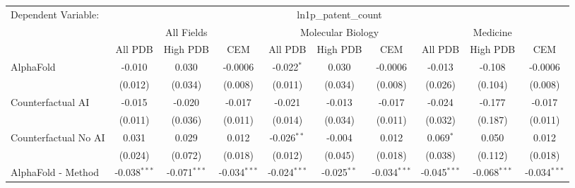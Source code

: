 \begingroup
\centering
\begin{tabular}{lccccccccc}
   \tabularnewline \midrule \midrule
   Dependent Variable: & \multicolumn{9}{c}{ln1p\_patent\_count}\\
 & \multicolumn{3}{c}{All Fields} & \multicolumn{3}{c}{Molecular Biology} & \multicolumn{3}{c}{Medicine} \\
\cmidrule(lr){2-7} \cmidrule(lr){5-10} \cmidrule(lr){8-7}
 & \multicolumn{1}{c}{All PDB} & \multicolumn{1}{c}{High PDB} & \multicolumn{1}{c}{CEM} & \multicolumn{1}{c}{All PDB} & \multicolumn{1}{c}{High PDB} & \multicolumn{1}{c}{CEM} & \multicolumn{1}{c}{All PDB} & \multicolumn{1}{c}{High PDB} & \multicolumn{1}{c}{CEM} \\
\cmidrule(lr){2-3} \cmidrule(lr){3-4} \cmidrule(lr){4-5} \cmidrule(lr){5-6} \cmidrule(lr){6-7} \cmidrule(lr){7-8} \cmidrule(lr){8-9} \cmidrule(lr){9-10} \cmidrule(lr){10-3}
   AlphaFold                                                   & -0.010         & 0.030          & -0.0006        & -0.022$^{*}$   & 0.030         & -0.0006        & -0.013         & -0.108         & -0.0006\\   
                                                               & (0.012)        & (0.034)        & (0.008)        & (0.011)        & (0.034)       & (0.008)        & (0.026)        & (0.104)        & (0.008)\\   
   Counterfactual AI                                           & -0.015         & -0.020         & -0.017         & -0.021         & -0.013        & -0.017         & -0.024         & -0.177         & -0.017\\   
                                                               & (0.011)        & (0.036)        & (0.011)        & (0.014)        & (0.034)       & (0.011)        & (0.032)        & (0.187)        & (0.011)\\   
   Counterfactual No AI                                        & 0.031          & 0.029          & 0.012          & -0.026$^{**}$  & -0.004        & 0.012          & 0.069$^{*}$    & 0.050          & 0.012\\   
                                                               & (0.024)        & (0.072)        & (0.018)        & (0.012)        & (0.045)       & (0.018)        & (0.038)        & (0.112)        & (0.018)\\   
   AlphaFold - Method                                          & -0.038$^{***}$ & -0.071$^{***}$ & -0.034$^{***}$ & -0.024$^{***}$ & -0.025$^{**}$ & -0.034$^{***}$ & -0.045$^{***}$ & -0.068$^{***}$ & -0.034$^{***}$\\   

\end{tabular}
